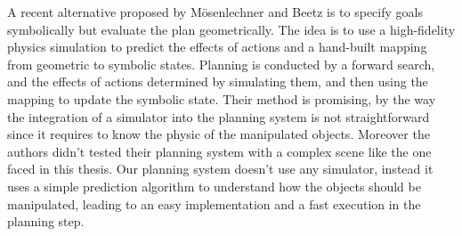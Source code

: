 A recent alternative proposed by Mösenlechner and Beetz \citep{Msenlechner2009UsingPA} is to specify goals symbolically but evaluate the plan geometrically.
The idea is to use a high-fidelity physics simulation to predict the effects of actions and a hand-built mapping from geometric to symbolic states. Planning is conducted by a forward search, and the effects of actions determined by simulating them, and then using the mapping to update the symbolic state. Their method is promising, by the way the integration of a simulator into the planning system is not straightforward since it requires to know the physic of the manipulated objects. Moreover the authors didn't tested their planning system with a complex scene like the one faced in this thesis.
Our planning system doesn't use any simulator, instead it uses a simple prediction algorithm to understand how the objects should be manipulated, leading to an easy implementation and a fast execution in the planning step. 




